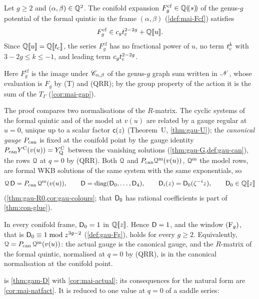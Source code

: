 \begin{cor}
\label{cor:int-gap}
Let $g\geq2$ and $(\alpha,\beta)\in\mathbb{Q}^2$. The conifold expansion $F_g^{\mathrm{cf}}\in\mathbb{Q}(\!(s)\!)$ of the genus-$g$ potential of the formal quintic in the frame $(\alpha,\beta)$ (\cref{def:mai-Fcf}) satisfies
\[
F_g^{\mathrm{cf}}\in c_gt_{\mathrm{c}}^{2-2g}+\mathbb{Q}[\![ u ]\!] .
\]
Since $\mathbb{Q}[\![ u ]\!]=\mathbb{Q}[\![ t_{\mathrm{c}} ]\!]$, the series $F_g^{\mathrm{cf}}$ has no fractional power of $u$, no term $t_{\mathrm{c}}^k$ with $3-2g\leq k\leq-1$, and leading term $c_gt_{\mathrm{c}}^{2-2g}$.
\end{cor}

Here $F_g^{\mathrm{cf}}$ is the image under $\mathscr{C}_{\alpha,\beta}$ of the genus-$g$ graph sum written in $\mathscr{N}$, whose evaluation is $F_g$ by (T) and (QRR); by the group property of the action \cite[Def.~2.13, Prop.~2.14]{PPZ15} it is the sum of the $T_\Gamma$ (\cref{cor:mai-gap}).

The proof compares two normalisations of the $R$-matrix. The cyclic systems of the formal quintic and of the model at $v(u)$ are related by a gauge regular at $u=0$, unique up to a scalar factor $\mathsf{c}(z)$ (Theorem~U, \cref{thm:gau-U}); the \emph{canonical gauge} $P_{\mathrm{can}}$ is fixed at the conifold point by the gauge identity $P_{\mathrm{can}}Y^{\mathrm{C}}(v(u))=Y^{\mathrm{C}}_{\mathrm{Q}}$ between the vanishing solutions (\cref{thm:gau-G,def:gau-can}), the rows $\mathcal{Q}$ at $q=0$ by (QRR). Both $\mathcal{Q}$ and $P_{\mathrm{can}}\mathcal{Q}^{\mathrm m}(v(u))$, $\mathcal{Q}^{\mathrm m}$ the model rows, are formal WKB solutions of the same system with the same exponentials, so
\[
\mathcal{Q}\,\mathsf{D}=P_{\mathrm{can}}\,\mathcal{Q}^{\mathrm m}(v(u)),\qquad \mathsf{D}=\operatorname{diag}(\mathsf{D}_0,\dots,\mathsf{D}_4),\qquad \mathsf{D}_i(z)=\mathsf{D}_0(\zeta^{-i}z),\qquad \mathsf{D}_0\in\mathbb{Q}[\![ z ]\!]
\]
(\cref{thm:gau-R0,cor:gau-colours}; that $\mathsf{D}_0$ has rational coefficients is part of \cref{thm:con-glue}).

\begin{thm}
\label{thm:int-D}
In every conifold frame, $\mathsf{D}_0=1$ in $\mathbb{Q}[\![ z ]\!]$. Hence $\mathsf{D}=1$, and the window $(\mathrm{F}_{g})$, that is $\mathsf{D}_0\equiv1\bmod z^{3g-2}$ (\cref{def:gau-Fg}), holds for every $g\geq2$. Equivalently, $\mathcal{Q}=P_{\mathrm{can}}\,\mathcal{Q}^{\mathrm m}(v(u))$: the actual gauge is the canonical gauge, and the $R$-matrix of the formal quintic, normalised at $q=0$ by (QRR), is in the canonical normalisation at the conifold point.
\end{thm}

 is \cref{thm:gam-D} with \cref{cor:mai-actual}; its consequences for the natural form are \cref{cor:mai-natfact}. It is reduced to one value at $q=0$ of a saddle series:

